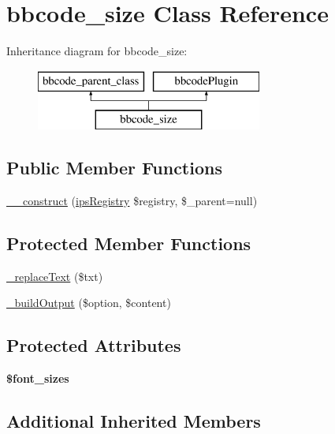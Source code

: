 \hypertarget{classbbcode__size}{\section{bbcode\-\_\-size Class Reference}
\label{classbbcode__size}
}
Inheritance diagram for bbcode\-\_\-size\-:\begin{figure}[H]
\begin{center}
\leavevmode
\includegraphics[height=2.000000cm]{classbbcode__size}
\end{center}
\end{figure}
\subsection*{Public Member Functions}
\begin{DoxyCompactItemize}
\item 
\hyperlink{classbbcode__size_a9c7a683aed4631ab88876012e950f1ab}{\-\_\-\-\_\-construct} (\hyperlink{classips_registry}{ips\-Registry} \$registry, \$\-\_\-parent=null)
\end{DoxyCompactItemize}
\subsection*{Protected Member Functions}
\begin{DoxyCompactItemize}
\item 
\hyperlink{classbbcode__size_a5001c42193db0c30308d9a3f17ccd950}{\-\_\-replace\-Text} (\$txt)
\item 
\hyperlink{classbbcode__size_a2f424a9a846dbad975010a7b69e292a2}{\-\_\-build\-Output} (\$option, \$content)
\end{DoxyCompactItemize}
\subsection*{Protected Attributes}
\begin{DoxyCompactItemize}
\item 
{\bfseries \$font\-\_\-sizes}
\end{DoxyCompactItemize}
\subsection*{Additional Inherited Members}


